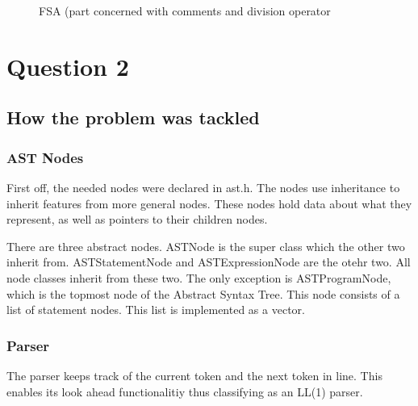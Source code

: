 \documentclass[a4paper, 12pt]{article}
\begin{document}
\begin{figure}[h]
    \centering
    \caption{FSA (part concerned with comments and division operator}
\end{figure}

\section{Question 2}
\subsection{How the problem was tackled}
\subsubsection{AST Nodes}
First off, the needed nodes were declared in ast.h. The nodes use inheritance to inherit features from more general nodes. These
nodes hold data about what they represent, as well as pointers to their children nodes.
\linebreak

There are three abstract nodes. ASTNode is the super class which the other two inherit from. ASTStatementNode and ASTExpressionNode
are the otehr two.
All node classes inherit from these two. The only exception is ASTProgramNode, which is the topmost node of the Abstract Syntax
Tree. This node consists of a list of statement nodes. This list is implemented
as a vector.

\subsubsection{Parser}
The parser keeps track of the current token and the next token in line. This enables its look ahead functionalitiy thus classifying 
as an LL(1) parser.
\end{document}
